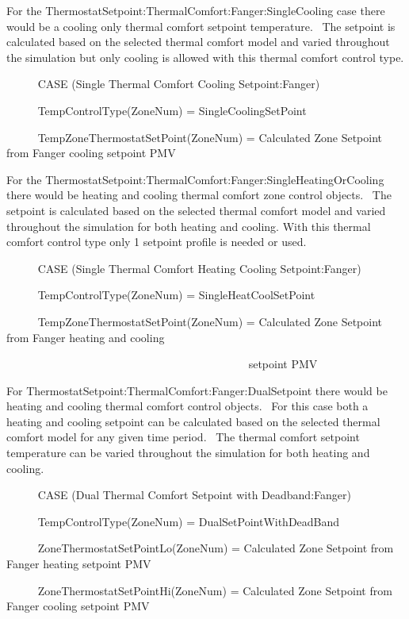 For the ThermostatSetpoint:ThermalComfort:Fanger:SingleCooling case there would be a cooling only thermal comfort setpoint temperature.~ The setpoint is calculated based on the selected thermal comfort model and varied throughout the simulation but only cooling is allowed with this thermal comfort control type.

~~~~~ CASE (Single Thermal Comfort Cooling Setpoint:Fanger)

~~~~~ TempControlType(ZoneNum) = SingleCoolingSetPoint

~~~~~ TempZoneThermostatSetPoint(ZoneNum) = Calculated Zone Setpoint from Fanger cooling setpoint PMV

For the ThermostatSetpoint:ThermalComfort:Fanger:SingleHeatingOrCooling there would be heating and cooling thermal comfort zone control objects.~ The setpoint is calculated based on the selected thermal comfort model and varied throughout the simulation for both heating and cooling. With this thermal comfort control type only 1 setpoint profile is needed or used.

~~~~~ CASE (Single Thermal Comfort Heating Cooling Setpoint:Fanger)

~~~~~ TempControlType(ZoneNum) = SingleHeatCoolSetPoint

~~~~~ TempZoneThermostatSetPoint(ZoneNum) = Calculated Zone Setpoint from Fanger heating and cooling

~~~~~~~~~~~~~~~~~~~~~~~~~~~~~~~~~~~~~~~~~~~ setpoint PMV

For ThermostatSetpoint:ThermalComfort:Fanger:DualSetpoint there would be heating and cooling thermal comfort control objects.~ For this case both a heating and cooling setpoint can be calculated based on the selected thermal comfort model for any given time period.~ The thermal comfort setpoint temperature can be varied throughout the simulation for both heating and cooling.

~~~~~ CASE (Dual Thermal Comfort Setpoint with Deadband:Fanger)

~~~~~ TempControlType(ZoneNum) = DualSetPointWithDeadBand

~~~~~ ZoneThermostatSetPointLo(ZoneNum) = Calculated Zone Setpoint from Fanger heating setpoint PMV

~~~~~ ZoneThermostatSetPointHi(ZoneNum) = Calculated Zone Setpoint from Fanger cooling setpoint PMV
